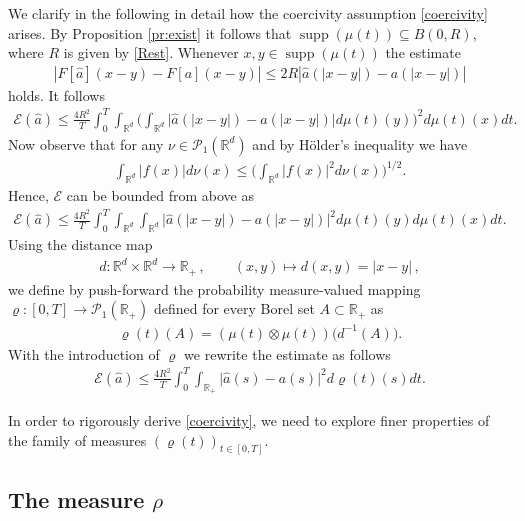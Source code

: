 \documentclass[A4paper,11pt]{article}
\theoremstyle{definition}
\newcommand{\R}{\mathbb{R}}
\DeclareMathOperator{\supp}{supp}
\begin{document}
We clarify in the following in detail how the coercivity assumption \eqref{coercivity} arises. By Proposition \ref{pr:exist} it follows that $\supp(\mu(t)) \subseteq B(0,R)$, where $R$ is given by \eqref{Rest}. Whenever $x,y \in \supp(\mu(t))$ the estimate
\begin{align*}
|F[\widehat a](x-y) - F[a](x-y)|\leq 2R|\widehat a(|x-y|) - a(|x-y|)|
\end{align*}
holds. It follows
\begin{align*}
	 \mathcal E(\widehat a)
		\leq\frac{4R^2}{T}\int_0^T\int_{\R^d}\biggl(\int_{\R^d}\bigl|\widehat a(|x-y|)-a(|x-y|)\bigr|
			d\mu(t)(y)\biggr)^2 d\mu(t)(x) dt.
\end{align*}
Now observe that for any $\nu\in \mathcal{P}_1(\R^d)$ and  by H\"older's inequality we have
\begin{align*}
	\int_{\R^d}|f(x)|d\nu(x)\leq\biggl(\int_{\R^d}|f(x)|^2 d\nu(x)\biggr)^{1/2}.
\end{align*}
Hence, $\mathcal E$ can be bounded from above as
\begin{align*}
	\mathcal E(\widehat a)\leq\frac{4R^2}{T}\int_0^T\int_{\R^d}\int_{\R^d}\bigl|\widehat a(|x-y|)-a(|x-y|)
		\bigr|^2 d\mu(t)(y) d\mu(t)(x) dt.
\end{align*}
Using the distance map
\begin{align*}
	d:\R^d\times\R^d\rightarrow\R_+\,,\qquad (x,y)\mapsto d(x,y)=|x-y|\,,
\end{align*}
we define by push-forward the probability measure-valued mapping $\varrho:[0,T]\rightarrow \mathcal{P}_1(\R_+)$ defined for every Borel set $A\subset\R_+$ as
\begin{align*}
	\varrho(t)(A)=(\mu(t)\otimes\mu(t))\bigl(d^{-1}(A)\bigr).
\end{align*}
With the introduction of $\varrho$ we rewrite the estimate as follows
\begin{align}\label{midpoint}
	\mathcal E(\widehat a)\leq\frac{4R^2}{T}\int_0^T\int_{\R_+}\bigl|\widehat a(s)-a(s)\bigr|^2 d\varrho(t)(s) dt.
\end{align}

In order to rigorously derive \eqref{coercivity}, we need to explore finer properties of the family of measures $(\varrho(t))_{t \in [0,T]}$.

\subsection{The measure $\rho$}
\end{document}

